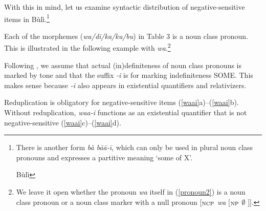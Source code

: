 \documentclass[output=paper,colorlinks,citecolor=brown]{langscibook}
\begin{document}
With this in mind, let us examine syntactic distribution of negative-sensitive items in Bùlì.\footnote{There is another form \textit{bà bāā-ī}, which can only be used in plural noun class pronouns and expresses a partitive meaning `some of X'.


\ea Bùlì
\z
\z
}


Each of the morphemes (\textit{wa/di/ka/ku/bu}) in Table 3 is a noun class pronoun. This is illustrated in the following example with \textit{wa}.\footnote{We leave it open whether the pronoun \textit{wa} itself in (\ref{pronoun2}) is a noun class pronoun or a noun class marker with a null pronoun [$_{\textup{NCP}}$ \textit{wa} [$_{\textup{NP}}$ $\emptyset$ ]].}

{}
\z

Following \cite{HiraiwaEtAl2017}, we assume that actual (in)definiteness of noun class pronouns is marked by tone and that the suffix \textit{-i} is for marking indefiniteness SOME. This makes sense because \textit{-i} also appears in existential quantifiers and relativizers.

\z

\z

Reduplication is obligatory for negative-sensitive items (\ref{waai}a)--(\ref{waai}b). Without reduplication, \textit{waa-i} functions as an existential quantifier that is not negative-sensitive (\ref{waai}c)--(\ref{waai}d).
\end{document}
